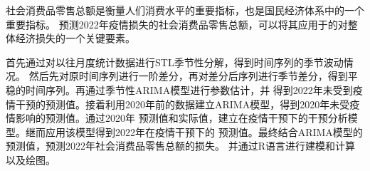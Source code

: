 

{\fangsong\xiaosihao
\setlength{\parindent}{2em}
社会消费品零售总额是衡量人们消费水平的重要指标，也是国民经济体系中的一个重要指标。
预测2022年疫情损失的社会消费品零售总额，可以将其应用于的对整体经济损失的一个关键要素。

首先通过对以往月度统计数据进行STL季节性分解，得到时间序列的季节波动情况。
然后先对原时间序列进行一阶差分，再对差分后序列进行季节差分，得到平稳的时间序列。再通过季节性ARIMA模型进行参数估计，并
得到2022年未受到疫情干预的预测值。接着利用2020年前的数据建立ARIMA模型，得到2020年未受疫情影响的预测值。通过2020年
预测值和实际值，建立在疫情干预下的干预分析模型。继而应用该模型得到2022年在疫情干预下的
预测值。最终结合ARIMA模型的预测值，预测2022年社会消费品零售总额的损失。
并通过R语言进行建模和计算以及绘图。
}







